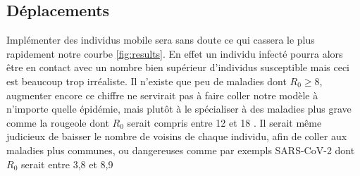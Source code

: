 \documentclass[journal, a4paper]{IEEEtran}
\begin{document}
\subsection{Déplacements}
Implémenter des individus mobile sera sans doute ce qui cassera le plus rapidement notre courbe \ref{fig:results}. En effet un individu infecté pourra alors être en contact avec un nombre bien supérieur d'individus susceptible mais ceci est beaucoup trop irréaliste. Il n'existe que peu de maladies dont $R_0 \geq 8$, augmenter encore ce chiffre ne servirait pas à faire coller notre modèle à n'importe quelle épidémie, mais plutôt à le spécialiser à des maladies plus grave comme la rougeole dont $R_0$ serait compris entre 12 et 18 \cite{Guerra_Bolotin_Lim_Heffernan_Deeks_Li_Crowcroft_2017}. Il serait même judicieux de baisser le nombre de voisins de chaque individu, afin de coller aux maladies plus communes, ou dangereuses comme par exempls SARS-CoV-2 dont $R_0$ serait entre 3,8 et 8,9 \cite{Sanche_Lin_Xu_Romero-Severson_Hengartner_Ke_2020}






\newpage

\end{document}
